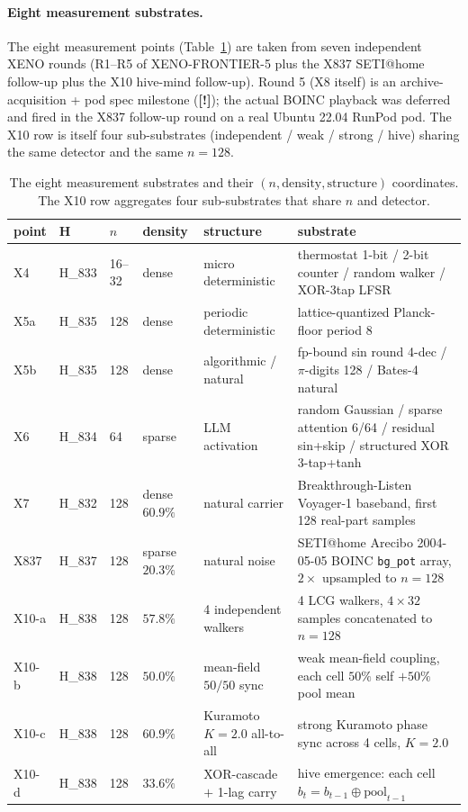 \documentclass[11pt,a4paper]{article}
\providecommand{\tierYellow}{\textbf{[!]}}  %
\begin{document}
\paragraph{Eight measurement substrates.}
The eight measurement points (Table~\ref{tab:substrates}) are taken from
seven independent XENO rounds (R1--R5 of XENO-FRONTIER-5 plus the X837
SETI@home follow-up plus the X10 hive-mind follow-up). Round 5 (X8
itself) is an archive-acquisition + pod spec milestone (\tierYellow);
the actual BOINC playback was deferred and fired in the X837 follow-up
round on a real Ubuntu 22.04 RunPod pod. The X10 row is itself four
sub-substrates (independent / weak / strong / hive) sharing the same
detector and the same $n=128$.

\begin{table}[h]
\centering
\small
\caption{The eight measurement substrates and their $(n, \text{density},
\text{structure})$ coordinates. The X10 row aggregates four
sub-substrates that share $n$ and detector.}
\label{tab:substrates}
\begin{tabular}{@{}lllllp{4.0cm}@{}}
\toprule
\textbf{point} & \textbf{H} & \textbf{$n$} & \textbf{density} &
\textbf{structure} & \textbf{substrate} \\
\midrule
X4   & H\_833 & 16--32 & dense   & micro deterministic
     & thermostat 1-bit / 2-bit counter / random walker / XOR-3tap LFSR \\
X5a  & H\_835 & 128    & dense   & periodic deterministic
     & lattice-quantized Planck-floor period 8 \\
X5b  & H\_835 & 128    & dense   & algorithmic / natural
     & fp-bound sin round 4-dec / $\pi$-digits 128 / Bates-4 natural \\
X6   & H\_834 & 64     & sparse  & LLM activation
     & random Gaussian / sparse attention 6/64 / residual sin+skip /
       structured XOR 3-tap+tanh \\
X7   & H\_832 & 128    & dense $60.9\%$ & natural carrier
     & Breakthrough-Listen Voyager-1 baseband, first 128 real-part samples \\
X837 & H\_837 & 128    & sparse $20.3\%$ & natural noise
     & SETI@home Arecibo 2004-05-05 BOINC \texttt{bg\_pot} array,
       $2\times$ upsampled to $n=128$ \\
X10-a & H\_838 & 128 & $57.8\%$ & 4 independent walkers
     & 4 LCG walkers, $4 \times 32$ samples concatenated to $n=128$ \\
X10-b & H\_838 & 128 & $50.0\%$ & mean-field $50/50$ sync
     & weak mean-field coupling, each cell $50\%$ self $+ 50\%$ pool mean \\
X10-c & H\_838 & 128 & $60.9\%$ & Kuramoto $K=2.0$ all-to-all
     & strong Kuramoto phase sync across 4 cells, $K=2.0$ \\
X10-d & H\_838 & 128 & $33.6\%$ & XOR-cascade $+$ 1-lag carry
     & hive emergence: each cell $b_t = b_{t-1} \oplus
       \text{pool}_{t-1}$ \\
\bottomrule
\end{tabular}
\end{table}
\end{document}
